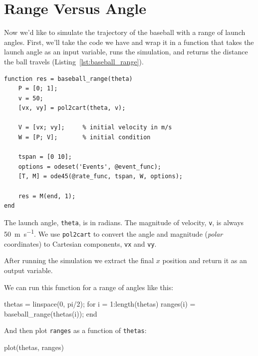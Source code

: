 

\section{Range Versus Angle}

Now we'd like to simulate the trajectory of the baseball with a range of launch angles.  First, we'll take the code we have and wrap it in a function that takes the launch angle as an input variable, runs the simulation, and returns the distance the ball travels (Listing~\ref{lst:baseball_range}).


\begin{lstlisting}[caption={A function that takes the launch angle of a baseball and returns the distance it travels}, label={lst:baseball_range}]
function res = baseball_range(theta)
    P = [0; 1];       
    v = 50;           
    [vx, vy] = pol2cart(theta, v);
    
    V = [vx; vy];     % initial velocity in m/s
    W = [P; V];       % initial condition
    
    tspan = [0 10];
    options = odeset('Events', @event_func);
    [T, M] = ode45(@rate_func, tspan, W, options);
    
    res = M(end, 1);
end
\end{lstlisting}

The launch angle, \lstinline{theta}, is in radians.  The magnitude of velocity, \lstinline{v}, is always \SI{50}{\meter\per\second}.  We use \lstinline{pol2cart} to convert the angle and magnitude (\emph{polar} coordinates) to Cartesian components, \lstinline{vx} and \lstinline{vy}.


After running the simulation we extract the final $x$ position and return it as an output variable.  

We can run this function for a range of angles like this:

\begin{code}
    thetas = linspace(0, pi/2);
    for i = 1:length(thetas)
        ranges(i) = baseball_range(thetas(i));
    end
\end{code}
And then plot \lstinline{ranges} as a function of \lstinline{thetas}:

\begin{code}
    plot(thetas, ranges)
\end{code}

